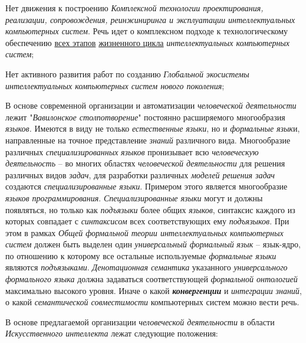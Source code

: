 \begin{textitemize}
	\item
	Нет движения к построению \textit{Комплексной технологии проектирования, реализации, сопровождения, реинжиниринга и эксплуатации интеллектуальных компьютерных систем}. Речь идет о комплексном подходе к технологическому обеспечению \underline{всех этапов} \underline{жизненного цикла} \textit{интеллектуальных компьютерных систем};
	\item
	Нет активного развития работ по созданию \textit{Глобальной} \textit{экосистемы интеллектуальных компьютерных систем нового поколения};
	\item
	В основе современной организации и автоматизации \textit{человеческой деятельности} лежит "\textit{Вавилонское столпотворение}"{} постоянно расширяемого многообразия \textit{языков.} Имеются в виду не только \textit{естественные} \textit{языки}, но и \textit{формальные} \textit{язык}и, направленные на точное представление \textit{знаний} различного вида. Многообразие различных \textit{специализированных} \textit{языков} пронизывает всю \textit{человеческую деятельность} -- во многих областях \textit{человеческой деятельности} для решения различных видов \textit{задач}, для разработки различных \textit{моделей решения задач} создаются \textit{специализированные языки}. Примером этого является многообразие \textit{языков программирования}. \textit{Специализированные языки} могут и должны появляться, но только как \textit{\textit{подъязыки}} более общих \textit{языков}, синтаксис каждого из которых совпадает с \textit{синтаксисом} всех соответствующих ему \textit{подъязыков}. При этом в рамках \textit{Общей формальной теории интеллектуальных компьютерных систем} должен быть выделен один \textit{универсальный формальный} \textit{язык} -- язык-ядро, по отношению к которому все остальные используемые \textit{формальные языки} являются \textit{подъязыками}. \textit{Денотационная семантика} указанного \textit{универсального формального языка} должна задаваться соответствующей \textit{формальной онтологией} максимально высокого уровня. Иначе о какой \textbf{\textit{конвергенции}} и \textit{интеграции} \textit{знаний}, о какой \textit{семантической совместимости} компьютерных систем можно вести речь.
\end{textitemize}

В основе предлагаемой организации \textit{человеческой деятельности} в области \textit{Искусственного интеллекта} лежат следующие положения:

